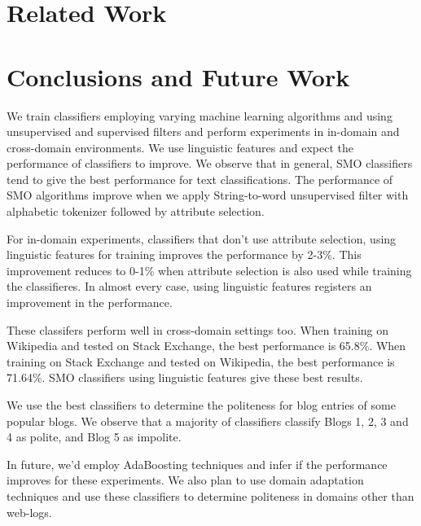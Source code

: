 \documentclass[conference]{IEEEtran}
\begin{document}
\section{Related Work}



\section{Conclusions and Future Work}
We train classifiers employing varying machine learning algorithms and using unsupervised and supervised filters and perform experiments in in-domain and cross-domain environments. We use linguistic features and expect the performance of classifiers to improve. We observe that in general, SMO classifiers tend to give the best performance for text classifications. The performance of SMO algorithms improve when we apply String-to-word unsupervised filter with alphabetic tokenizer followed by attribute selection. 

For in-domain experiments, classifiers that don't use attribute selection, using linguistic features for training improves the performance by 2-3\%. This improvement reduces to 0-1\% when attribute selection is also used while training the classifieres. In almost every case, using linguistic features registers an improvement in the performance.

These classifers perform well in cross-domain settings too. When training on Wikipedia and tested on Stack Exchange, the best performance is 65.8\%. When training on Stack Exchange and tested on Wikipedia, the best performance is 71.64\%. SMO classifiers using linguistic features give these best results.

We use the best classifiers to determine the politeness for blog entries of some popular blogs. We observe that a majority of classifiers classify Blogs 1, 2, 3 and 4 as polite, and Blog 5 as impolite.

In future, we'd employ AdaBoosting techniques and infer if the performance improves for these experiments. We also plan to use domain adaptation techniques and use these classifiers to determine politeness in domains other than web-logs.
\end{document}
